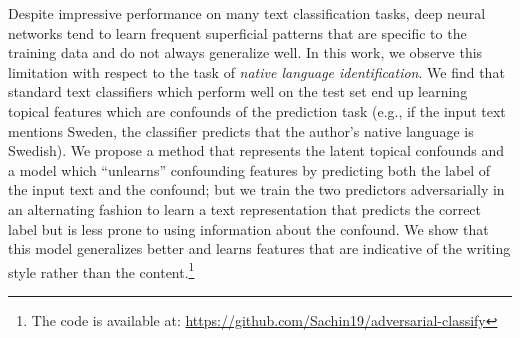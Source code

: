 Despite impressive performance on many text classification tasks, deep neural networks tend to learn frequent superficial patterns that are specific to the training data and do not always generalize well. In this work, we observe this limitation with respect to the task of \emph{native language identification}. We find that standard text classifiers which perform well on the test set end up learning topical features which are confounds of the prediction task (e.g., if the input text mentions Sweden, the classifier predicts that the author's native language is Swedish). 
  We propose a method that represents the latent topical confounds and a model which ``unlearns'' confounding features by predicting both the label of the input text and the confound; but we train the two predictors adversarially in an alternating fashion to learn a text representation that predicts the correct label but is less prone to using information about the confound. We show that this model generalizes better and learns features that are indicative of the writing style rather than the content.\footnote{The code is available at: \url{https://github.com/Sachin19/adversarial-classify}}